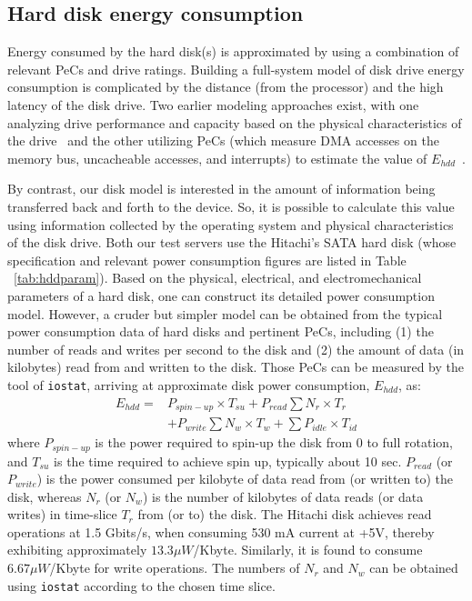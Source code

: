 \documentclass[acmtaco]{acmtrans2m}
\begin{document}
\subsection{Hard disk energy consumption}
\label{sec:networkengery}
Energy consumed by the hard disk(s) is approximated by using a
combination of relevant PeCs and drive ratings. Building a full-system
model of disk drive energy consumption is complicated by the distance
(from the processor) and the high latency of the disk drive.  Two
earlier modeling approaches exist, with one analyzing drive performance
and capacity based on the physical characteristics of the
drive~\cite{Gurumurthi2005} and the other utilizing PeCs (which measure
DMA accesses on the memory bus, uncacheable accesses, and interrupts) to
estimate the value of $E_{hdd}$~\cite{Bircher2011}.

By contrast, our disk model is interested in the amount of information
being transferred back and forth to the device.  So, it is possible to
calculate this value using information collected by the operating system
and physical characteristics of the disk drive. Both our test servers
use the Hitachi's SATA hard disk (whose specification and relevant power
consumption figures are listed in Table ~\ref{tab:hddparam}).  Based on
the physical, electrical, and electromechanical parameters of a hard
disk, one can construct its detailed power consumption model.  However,
a cruder but simpler model can be obtained from the typical power
consumption data of hard disks and pertinent PeCs, including (1) the
number of reads and writes per second to the disk and (2) the amount of
data (in kilobytes) read from and written to the disk.  Those PeCs can
be measured by the tool of \texttt{iostat}, arriving at approximate disk
power consumption, $E_{hdd}$, as:
\begin{align*}
\label{eq:hddpwr1}
E_{hdd} = &P_{spin-up}\times T_{su}+  P_{read}\sum N_r\times T_r \nonumber\\
        &+ P_{write}\sum N_w\times T_w+ \sum P_{idle}\times T_{id}
\end{align*}
where $P_{spin-up}$ is the power required to spin-up the disk from 0 to
full rotation, and $T_{su}$ is the time required to achieve spin up,
typically about 10 sec.  $P_{read}$ (or $P_{write}$) is the power
consumed per kilobyte of data read from (or written to) the disk,
whereas $N_r$ (or $N_w$) is the number of kilobytes of data reads (or
data writes) in time-slice $T_r$ from (or to) the disk.  The Hitachi
disk achieves read operations at 1.5 Gbits/s, when consuming 530 mA
current at +5V, thereby exhibiting approximately $13.3 \mu W$/Kbyte.
Similarly, it is found to consume $6.67 \mu W$/Kbyte for write
operations.  The numbers of $N_r$ and $N_w$ can be obtained using
\texttt{iostat} according to the chosen time slice.
\end{document}

